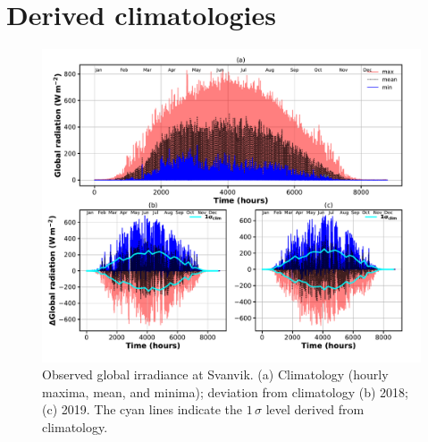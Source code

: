 \documentclass[bg, manuscript]{copernicus}
\begin{document}
\clearpage

\appendix
\section{Derived climatologies}    %


\appendixfigures  %
\begin{figure}[t]
  \includegraphics[width=12cm]{figA1}
  \caption{Observed global irradiance at Svanvik. (a) Climatology (hourly maxima, mean, and minima); deviation from climatology (b) 2018; (c) 2019. The cyan lines indicate the $1\,\sigma$ level derived from climatology.}
  \label{fig:global_rad_clim}
\end{figure}
\end{document}
